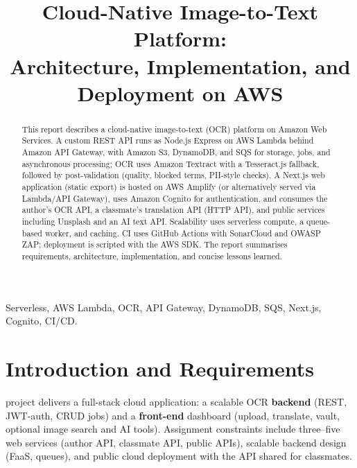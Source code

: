 \documentclass[conference]{IEEEtran}
\begin{document}
\title{Cloud-Native Image-to-Text Platform:\\Architecture, Implementation, and Deployment on AWS}

\author{
}

\maketitle

\begin{abstract}
This report describes a cloud-native image-to-text (OCR) platform on Amazon Web Services. A custom REST API runs as Node.js Express on AWS Lambda behind Amazon API Gateway, with Amazon S3, DynamoDB, and SQS for storage, jobs, and asynchronous processing; OCR uses Amazon Textract with a Tesseract.js fallback, followed by post-validation (quality, blocked terms, PII-style checks). A Next.js web application (static export) is hosted on AWS Amplify (or alternatively served via Lambda/API Gateway), uses Amazon Cognito for authentication, and consumes the author's OCR API, a classmate's translation API (HTTP API), and public services including Unsplash and an AI text API. Scalability uses serverless compute, a queue-based worker, and caching. CI uses GitHub Actions with SonarCloud and OWASP ZAP; deployment is scripted with the AWS SDK. The report summarises requirements, architecture, implementation, and concise lessons learned.
\end{abstract}

\begin{IEEEkeywords}
Serverless, AWS Lambda, OCR, API Gateway, DynamoDB, SQS, Next.js, Cognito, CI/CD.
\end{IEEEkeywords}

\section{Introduction and Requirements}

 project delivers a full-stack cloud application: a scalable OCR \textbf{backend} (REST, JWT-auth, CRUD jobs) and a \textbf{front-end} dashboard (upload, translate, vault, optional image search and AI tools). Assignment constraints include three--five web services (author API, classmate API, public APIs), scalable backend design (FaaS, queues), and public cloud deployment with the API shared for classmates.
\end{document}
